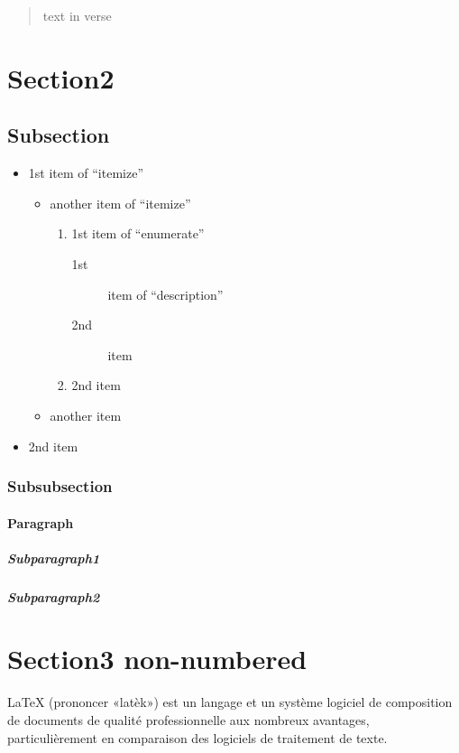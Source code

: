 \documentclass[a4paper,12pt]{article}%
\begin{document}
\begin{verse}
	text in verse
\end{verse}

\section{Section2}

\subsection{Subsection}
\begin{itemize}
\item 1st item of ``itemize''
	\begin{itemize}
	\item another item of ``itemize''
		\begin{enumerate}
		\item 1st item of ``enumerate''
			\begin{description}
			\item[1st] item of ``description''
			\item[2nd] item
			\end{description}
		\item 2nd item
		\end{enumerate}
	\item another item 	
	\end{itemize}
\item 2nd item
\end{itemize}
\subsubsection{Subsubsection}

\paragraph{Paragraph}

\subparagraph{Subparagraph1}

\subparagraph{Subparagraph2}

\clearpage

\section*{Section3 non-numbered}
{\LaTeX}
(prononcer «latèk») est un langage et un système logiciel de composition de documents de qualité professionnelle aux nombreux avantages, particulièrement en comparaison des logiciels de traitement de texte.
\end{document}

